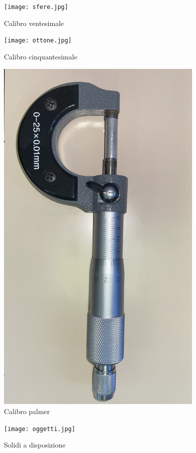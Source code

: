 \documentclass{article}
\begin{document}
\begin{figure} [h]
    \centering
    \texttt{[image: sfere.jpg]}
    \caption{Calibro ventesimale}
    \label{fig:my_label}
\end{figure}

\begin{figure}
    \centering
    \texttt{[image: ottone.jpg]}
    \caption{Calibro cinquantesimale}
    \label{fig:my_label}
\end{figure}

\begin{figure}
    \centering
    \includegraphics[width = 10cm]{palmer.jpg}
    \caption{Calibro palmer}
    \label{fig:my_label}
\end{figure}

\begin{figure} [t]
    \centering
    \texttt{[image: oggetti.jpg]}
    \caption{Solidi a disposizione}
    \label{fig:my_label}
\end{figure}
\end{document}
